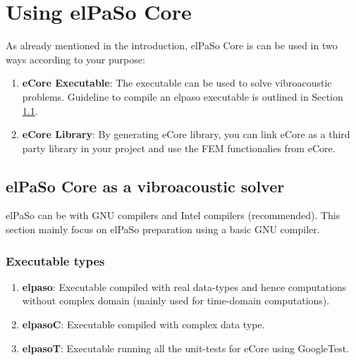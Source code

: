 \chapter{Using elPaSo Core}

As already mentioned in the introduction, elPaSo Core is can be used in two ways according to your purpose:
\begin{enumerate}
    \item \textbf{eCore Executable}: The executable can be used to solve vibroacoustic problems. Guideline to compile an elpaso executable is outlined in Section \ref{sec:eCoreAsSolver}.
    \item \textbf{eCore Library}: By generating eCore library, you can link eCore as a third party library in your project and use the FEM functionalies from eCore.
\end{enumerate}

\section{elPaSo Core as a vibroacoustic solver} \label{sec:eCoreAsSolver}

elPaSo can be with GNU compilers and Intel compilers (recommended). This section mainly focus on elPaSo preparation using a basic GNU compiler.

\subsection{Executable types}
\begin{enumerate}
    \item \textbf{elpaso}: Executable compiled with real data-types and hence computations without complex domain (mainly used for time-domain computations).
    \item \textbf{elpasoC}: Executable compiled with complex data type.
    \item \textbf{elpasoT}: Executable running all the unit-tests for eCore using GoogleTest.
\end{enumerate}

